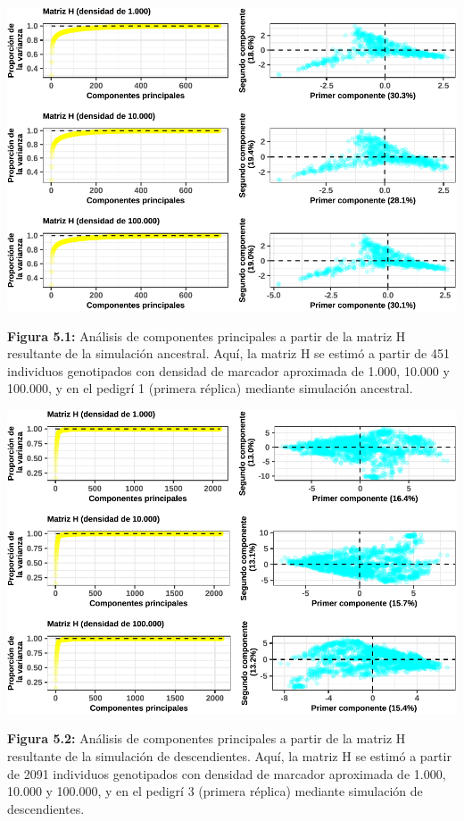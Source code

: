 \documentclass[11pt,spanish,a4paper,oneside,]{book} %
\begin{document}
\begin{center}\includegraphics[width=1\linewidth]{figures/Graf_PCA_mH_Molcoanc} \end{center}

\noindent
\textbf{Figura 5.1:} Análisis de componentes principales a partir de la matriz H resultante de la simulación ancestral. Aquí, la matriz H se estimó a partir de 451 individuos genotipados con densidad de marcador aproximada de 1.000, 10.000 y 100.000, y en el pedigrí 1 (primera réplica) mediante simulación ancestral.

\newpage

\begin{center}\includegraphics[width=1\linewidth]{figures/Graf_PCA_mH_SeqBreed} \end{center}

\noindent
\textbf{Figura 5.2:} Análisis de componentes principales a partir de la matriz H resultante de la simulación de descendientes. Aquí, la matriz H se estimó a partir de 2091 individuos genotipados con densidad de marcador aproximada de 1.000, 10.000 y 100.000, y en el pedigrí 3 (primera réplica) mediante simulación de descendientes.
\end{document}
